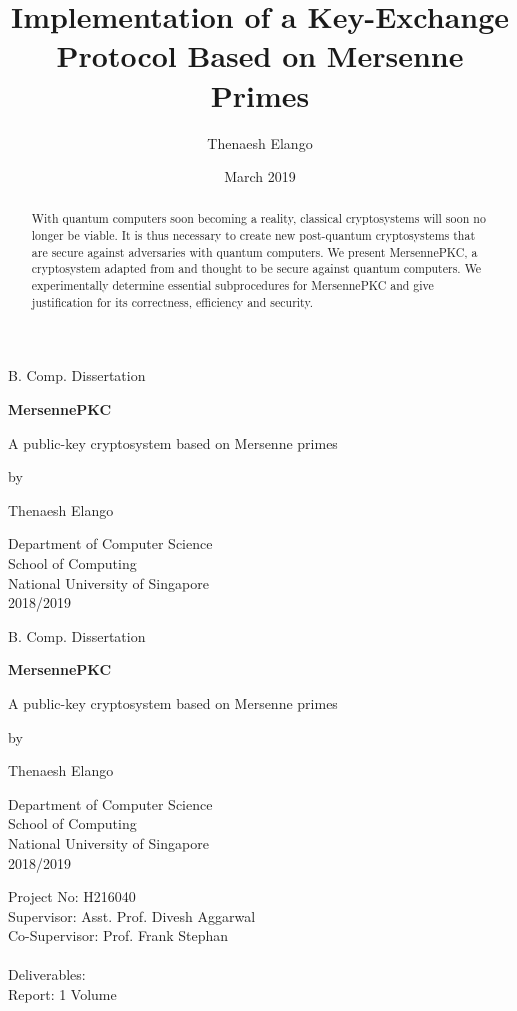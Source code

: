 \documentclass[12pt]{report}
\title{Implementation of a Key-Exchange Protocol Based on Mersenne Primes}
\author{Thenaesh Elango}
\date{March 2019}
\theoremstyle{definition}
\begin{document}
\begin{titlepage} \centering B. Comp. Dissertation\par \vfill {\huge\bfseries MersennePKC \par {\Large A public-key cryptosystem based on Mersenne primes} \par} \vfill {\Large by \par Thenaesh Elango\par} \vfill { \doublespacing Department of Computer Science \\ School of Computing \\ National University of Singapore \\ \vspace{\baselineskip} 2018/2019 \\ } \end{titlepage} \begin{titlepage} \centering B. Comp. Dissertation\par \vfill {\huge\bfseries MersennePKC \par {\Large A public-key cryptosystem based on Mersenne primes} \par} \vfill {\Large by \par Thenaesh Elango\par} \vfill { \doublespacing Department of Computer Science \\ School of Computing \\ National University of Singapore \\ \vspace{\baselineskip} 2018/2019 \\ } \vfill { \begin{flushleft} Project No: H216040 \\ Supervisor: Asst. Prof. Divesh Aggarwal \\ Co-Supervisor: Prof. Frank Stephan \\ \hfill\\ Deliverables: \\ \qquad\qquad Report: 1 Volume \end{flushleft} } \end{titlepage}


\begin{abstract}
    With quantum computers soon becoming a reality, classical cryptosystems will soon no longer be viable. It is thus necessary to create new post-quantum cryptosystems that are secure against adversaries with quantum computers. We present MersennePKC, a cryptosystem adapted from \cite{aggarwal2018new} and thought to be secure against quantum computers. We experimentally determine essential subprocedures for MersennePKC and give justification for its correctness, efficiency and security.
\end{abstract}
\end{document}
